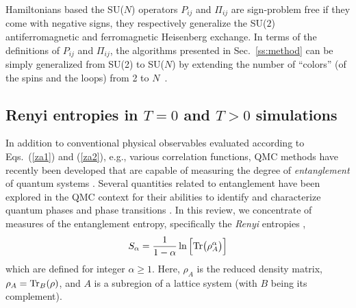 \documentclass[range]{ar2e}
\begin{document}
Hamiltonians based the SU($N$) operators $P_{ij}$ and $\Pi_{ij}$ are sign-problem free if they come with negative signs,
they respectively generalize the SU($2$) antiferromagnetic and ferromagnetic Heisenberg exchange. In terms of the definitions of $P_{ij}$ and 
$\Pi_{ij}$, the algorithms presented in Sec.~\ref{ss:method} can be simply generalized from SU(2) to SU($N$) by extending the number of ``colors'' 
(of the spins and the loops) from 2 to $N$~\cite{harada2003:sun,beach2009:sun,kaul2011:j1j2}.

\subsection{Renyi entropies in $T=0$ and $T>0$ simulations} 
\label{ss:renyi}

In addition to conventional physical observables evaluated according to Eqs.~(\ref{za1}) and (\ref{za2}), e.g., various correlation functions, 
QMC methods have recently been developed that are capable of measuring the degree of {\it entanglement} of quantum systems \cite{EntangleMeasure}. Several 
quantities related to entanglement have been explored in the QMC context for their abilities to identify and characterize quantum phases and phase 
transitions \cite{Tommaso1,Tommaso2,fluc1,fluc2,fid1,fid2}.  In this review, we concentrate of measures of the entanglement entropy, specifically 
the {\it Renyi} entropies \cite{renyi},
\begin{equation}
S_{\alpha} = \frac{1}{1-\alpha} \ln \Big[ {\rm Tr}\big( \rho_A^{\alpha} \big) \Big]
\end{equation}
which are defined for integer $\alpha \ge 1$.  Here, $\rho_A$ is the reduced density matrix, $\rho_A = {\rm Tr}_B (\rho)$, and $A$ is a subregion of 
a lattice system (with $B$ being its complement).  
 
\end{document}

